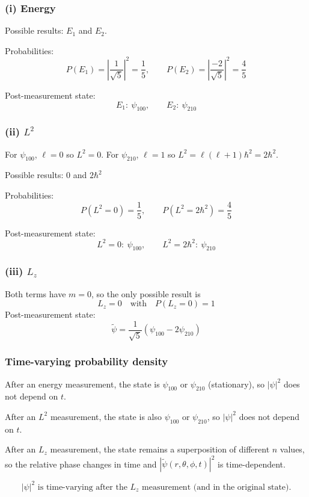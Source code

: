 \documentclass{article}
\begin{document}
\subsubsection*{(i) Energy}

Possible results: $E_1$ and $E_2$.

Probabilities:
\[
P(E_1)=\left|\frac{1}{\sqrt{5}}\right|^2=\frac{1}{5},
\qquad
P(E_2)=\left|\frac{-2}{\sqrt{5}}\right|^2=\frac{4}{5}
\]

Post-measurement state:
\[
E_1:\ \psi_{100},
\qquad
E_2:\ \psi_{210}
\]

\subsubsection*{(ii) $L^2$}

For $\psi_{100}$, $\ell=0$ so $L^2=0$.
For $\psi_{210}$, $\ell=1$ so $L^2=\ell(\ell+1)\hbar^2=2\hbar^2$.

Possible results: $0$ and $2\hbar^2$

Probabilities:
\[
P(L^2=0)=\frac{1}{5},\qquad P(L^2=2\hbar^2)=\frac{4}{5}
\]

Post-measurement state:
\[
L^2=0:\ \psi_{100},
\qquad
L^2=2\hbar^2:\ \psi_{210}
\]

\subsubsection*{(iii) $L_z$}

Both terms have $m=0$, so the only possible result is
\[
\boxed{L_z=0}
\quad\text{with}\quad
P(L_z=0)=1
\]
Post-measurement state:
\[
\tilde{\psi}=\frac{1}{\sqrt{5}}\left(\psi_{100}-2\psi_{210}\right)
\]

\subsubsection*{Time-varying probability density}

After an energy measurement, the state is $\psi_{100}$ or $\psi_{210}$ (stationary), so $|\psi|^2$ does not depend on $t$.

After an $L^2$ measurement, the state is also $\psi_{100}$ or $\psi_{210}$, so $|\psi|^2$ does not depend on $t$.

After an $L_z$ measurement, the state remains a superposition of different $n$ values, so the relative phase changes in time and $|\tilde{\psi}(r,\theta,\phi,t)|^2$ is time-dependent.

\[
\boxed{\text{$|\psi|^2$ is time-varying after the $L_z$ measurement (and in the original state).}}
\]
\end{document}

